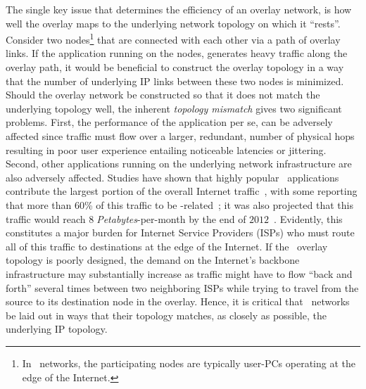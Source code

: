 The single key issue that determines the efficiency of an overlay network,
is how well the overlay maps to the underlying network topology on which it
``rests''. 
Consider two nodes\footnote{In \p\ networks,
the participating nodes are typically user-PCs operating at the edge of the
Internet.} that are connected with each other via a path of overlay links.
If the application running on the nodes, generates heavy traffic along
the overlay path, it would be beneficial to
construct the overlay topology in a way that the number of 
underlying IP links between these two nodes is minimized.
Should the overlay network be constructed so that
it does not match the underlying topology well, 
the inherent \emph{topology mismatch} gives two
significant problems. First, the performance of the application per se, can be
adversely affected since traffic must flow over a larger,
redundant, number of physical hops resulting in poor user experience 
entailing noticeable latencies or jittering. 
Second, other applications running
on the underlying network infrastructure are also adversely affected.
Studies have shown that highly popular \p\ applications contribute 
the largest portion of the overall 
Internet traffic~\cite{seroiu_analysiscds_2002,sen_analyzep2ptraffic_2004,krp_ispfear_2005}, with some reporting that more than $60$\% of this traffic 
to be \p-related~\cite{cachelogic,ipoque2007,ipoque2009};
it was also projected that this traffic would reach
$8\;$\emph{Petabytes}-per-month by the end of $2012$~\cite{multinteligence}. 
Evidently, this constitutes a major burden for 
Internet Service Providers (ISPs) who must route 
all of this traffic to destinations at the edge of the Internet. 
If the \p\ overlay topology is poorly designed, 
the demand on the Internet's backbone infrastructure may 
substantially increase as traffic might have to flow
``back and forth'' several times between two neighboring ISPs
while trying to travel from the source to its destination node
in the overlay.
Hence, it is critical that \p\ networks be laid out 
in ways that their topology matches, as closely as possible, the 
underlying IP topology.

